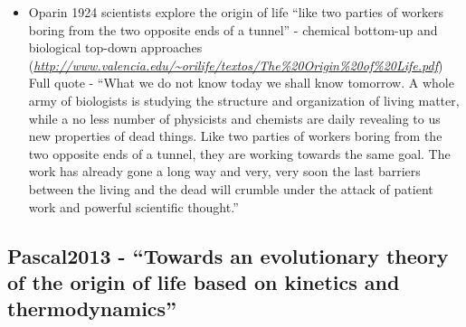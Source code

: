 \begin{itemize}
			\item
			
			Oparin 1924 scientists explore the origin of life ``like two parties
			of workers boring from the two opposite ends of a tunnel'' - chemical
			bottom-up and biological top-down approaches
			(\href{http://www.valencia.edu/~orilife/textos/The\%20Origin\%20of\%20Life.pdf}{\emph{http://www.valencia.edu/\textasciitilde{}orilife/textos/The\%20Origin\%20of\%20Life.pdf}})
			Full quote - ``What we do not know today we shall know tomorrow. A
			whole army of biologists is studying the structure and organization of
			living matter, while a no less number of physicists and chemists are
			daily revealing to us new properties of dead things. Like two parties
			of workers boring from the two opposite ends of a tunnel, they are
			working towards the same goal. The work has already gone a long way
			and very, very soon the last barriers between the living and the dead
			will crumble under the attack of patient work and powerful scientific
			thought.''
			
		\end{itemize}
		
		\hypertarget{pascal2013---towards-an-evolutionary-theory-of-the-origin-of-life-based-on-kinetics-and-thermodynamics}{\subsection{Pascal2013
				- ``Towards an evolutionary theory of the origin of life based on
				kinetics and
				thermodynamics''}\label{pascal2013---towards-an-evolutionary-theory-of-the-origin-of-life-based-on-kinetics-and-thermodynamics}}
		
